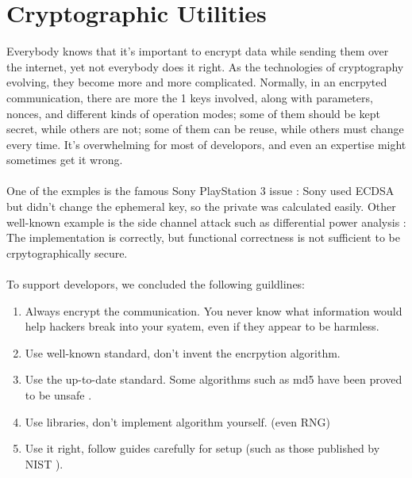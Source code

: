 \documentclass[conference]{IEEEtran}
\begin{document}
\section{Cryptographic Utilities}
Everybody knows that it's important to encrypt data while sending them over the internet,
yet not everybody does it right.
As the technologies of cryptography evolving,
they become more and more complicated.
Normally, in an encrpyted communication, there are more the 1 keys involved,
along with parameters, nonces, and different kinds of operation modes;
some of them should be kept secret, while others are not;
some of them can be reuse, while others must change every time.
It's overwhelming for most of developors, and even an expertise might sometimes get it wrong.
\\\\
One of the exmples is the famous Sony PlayStation 3 issue \cite{PS3_Jailbreak}:
Sony used ECDSA \cite{ECDSA} but didn't change the ephemeral key, so the
private was calculated easily.
Other well-known example is the
side channel attack such as differential power analysis \cite{differential}:
The implementation is correctly, but functional correctness is not sufficient to
be crpytographically secure.
\\\\
To support developors, we concluded the following guildlines:
\begin{enumerate}[label=\textbf{\arabic*.}]
    \item
Always encrypt the communication. You never know what information would help hackers
break into your syatem, even if they appear to be harmless.
    \item
Use well-known standard, don't invent the encrpytion algorithm.
    \item
Use the up-to-date standard.
Some algorithms such as md5 have been proved to be unsafe \cite{md5_break}.
    \item
Use libraries, don't implement algorithm yourself.
(even  RNG)
    \item
Use it right,
follow guides carefully for setup (such as those published by NIST \cite{NIST}).
\end{enumerate}
\end{document}
